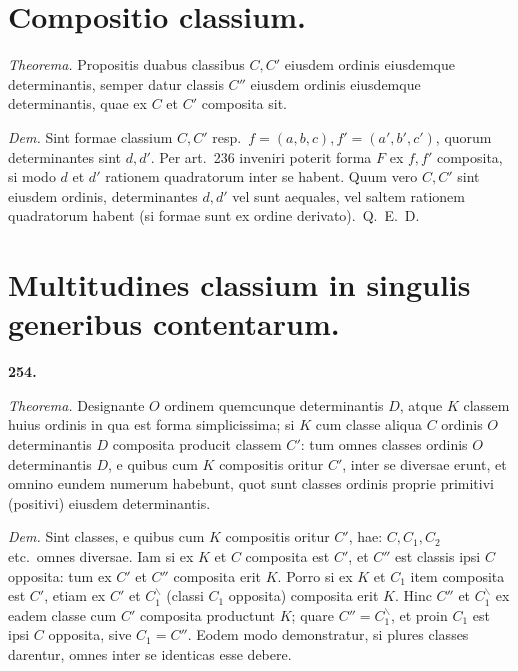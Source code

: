 \documentclass[12pt,a4paper]{article}
\theoremstyle{plain}
\theoremstyle{definition}
\theoremstyle{remark}
\begin{document}
\newpage
\section*{Compositio classium.}

\textit{Theorema.} Propositis duabus classibus $C, C'$ eiusdem ordinis eiusdemque determinantis, semper datur classis $C''$ eiusdem ordinis eiusdemque determinantis, quae ex $C$ et $C'$ composita sit.

\textit{Dem.} Sint formae classium $C, C'$ resp.\ $f = (a,b,c), f' = (a',b',c')$, quorum determinantes sint $d, d'$. Per art.\ 236 inveniri poterit forma $F$ ex $f, f'$ composita, si modo $d$ et $d'$ rationem quadratorum inter se habent. Quum vero $C, C'$ sint eiusdem ordinis, determinantes $d, d'$ vel sunt aequales, vel saltem rationem quadratorum habent (si formae sunt ex ordine derivato).\ Q.\ E.\ D.

\newpage
\section*{Multitudines classium in singulis generibus contentarum.}

\begin{center}\textbf{254.}\end{center}

\textit{Theorema.} Designante $O$ ordinem quemcunque determinantis $D$, atque $K$ classem huius ordinis in qua est forma simplicissima; si $K$ cum classe aliqua $C$ ordinis $O$ determinantis $D$ composita producit classem $C'$: tum omnes classes ordinis $O$ determinantis $D$, e quibus cum $K$ compositis oritur $C'$, inter se diversae erunt, et omnino eundem numerum habebunt, quot sunt classes ordinis proprie primitivi (positivi) eiusdem determinantis.

\textit{Dem.} Sint classes, e quibus cum $K$ compositis oritur $C'$, hae: $C, C_1, C_2$ etc.\ omnes diversae. Iam si ex $K$ et $C$ composita est $C'$, et $C''$ est classis ipsi $C$ opposita: tum ex $C'$ et $C''$ composita erit $K$. Porro si ex $K$ et $C_1$ item composita est $C'$, etiam ex $C'$ et $C_1^{\backslash}$ (classi $C_1$ opposita) composita erit $K$. Hinc $C''$ et $C_1^{\backslash}$ ex eadem classe cum $C'$ composita productunt $K$; quare $C'' = C_1^{\backslash}$, et proin $C_1$ est ipsi $C$ opposita, sive $C_1 = C''$. Eodem modo demonstratur, si plures classes darentur, omnes inter se identicas esse debere.
\end{document}
